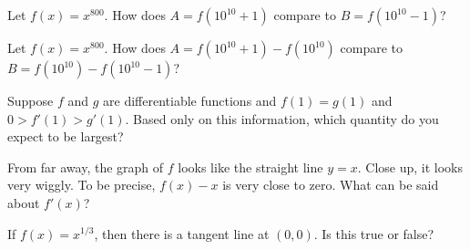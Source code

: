 \documentclass{ximera}
\newcommand{\recommendation}[1]{}
\newcommand{\GoodQuestions}[1]{}
\begin{document}
\begin{problem}
\recommendation{Vic}
  Let $f(x) = x^{800}$.  How does $A = f(10^{10} + 1)$ compare to $B = f(10^{10} - 1)$?
  \begin{multipleChoice}
  \end{multipleChoice}
\end{problem}

\begin{problem}
  Let $f(x) = x^{800}$.  How does $A = f(10^{10} + 1) - f(10^{10})$ compare to $B = f(10^{10}) - f(10^{10} - 1)$?
  \begin{multipleChoice}
  \end{multipleChoice}
\end{problem}

\begin{problem}
\recommendation{Vic}
  Suppose $f$ and $g$ are differentiable functions and $f(1) = g(1)$ and 
  $0 > f'(1) > g'(1)$.  Based only on this information, which quantity
  do you expect to be largest?
  \begin{multipleChoice}
  \end{multipleChoice}
\end{problem}



\begin{problem}
  From far away, the graph of $f$ looks like the straight line
  $y = x$.  Close up, it looks very wiggly.  To be precise, $f(x) - x$
  is very close to zero.  What can be said about $f'(x)$?
  \begin{multipleChoice}
  \end{multipleChoice}
\end{problem}

\begin{problem}
  \recommendation{Vic}
  \GoodQuestions{Subject: Derivatives 2Q}

  If $f(x)=x^{1/3}$, then there is a
  tangent line at $(0,0)$.  Is this true or false?
  \begin{multipleChoice}
  \end{multipleChoice}
\end{problem}
\end{document}
